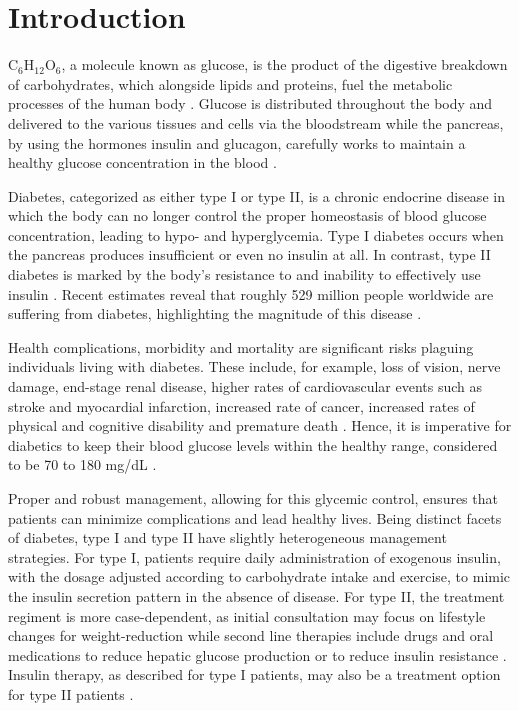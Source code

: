 
\section{Introduction}

$\text{C}_6\text{H}_{12}\text{O}_6$, a molecule known as glucose, is the product of the digestive breakdown of carbohydrates, which alongside lipids and proteins, fuel the metabolic processes of the human body \cite{noauthor_human_nodate}. Glucose is distributed throughout the body and delivered to the various tissues and cells via the bloodstream while the pancreas, by using the hormones insulin and glucagon, carefully works to maintain a healthy glucose concentration in the blood \cite{roder_pancreatic_2016}.

Diabetes, categorized as either type I or type II, is a chronic endocrine disease in which the body can no longer control the proper homeostasis of blood glucose concentration, leading to hypo- and hyperglycemia. Type I diabetes occurs when the pancreas produces insufficient or even no insulin at all. In contrast, type II diabetes is marked by the body's resistance to and inability to effectively use insulin \cite{world_health_organization_global_2016}. Recent estimates reveal that roughly 529 million people worldwide are suffering from diabetes, highlighting the magnitude of this disease \cite{ong_global_2023}.

Health complications, morbidity and mortality are significant risks plaguing individuals living with diabetes. These include, for example, loss of vision, nerve damage, end-stage renal disease, higher rates of cardiovascular events such as stroke and myocardial infarction, increased rate of cancer, increased rates of physical and cognitive disability and premature death \cite{world_health_organization_global_2016}. Hence, it is imperative for diabetics to keep their blood glucose levels within the healthy range, considered to be 70 to 180 mg/dL \cite{noauthor_time_2021}.


Proper and robust management, allowing for this glycemic control, ensures that patients can minimize complications and lead healthy lives. Being distinct facets of diabetes, type I and type II have slightly heterogeneous management strategies. For type I, patients require daily administration of exogenous insulin, with the dosage adjusted according to carbohydrate intake and exercise, to mimic the insulin secretion pattern in the absence of disease. For type II, the treatment regiment is more case-dependent, as initial consultation may focus on lifestyle changes for weight-reduction while second line therapies include drugs and oral medications to reduce hepatic glucose production or to reduce insulin resistance \cite{bilous_handbook_2021}. Insulin therapy, as described for type I patients, may also be a treatment option for type II patients \cite{noauthor_patient_nodate}. 

